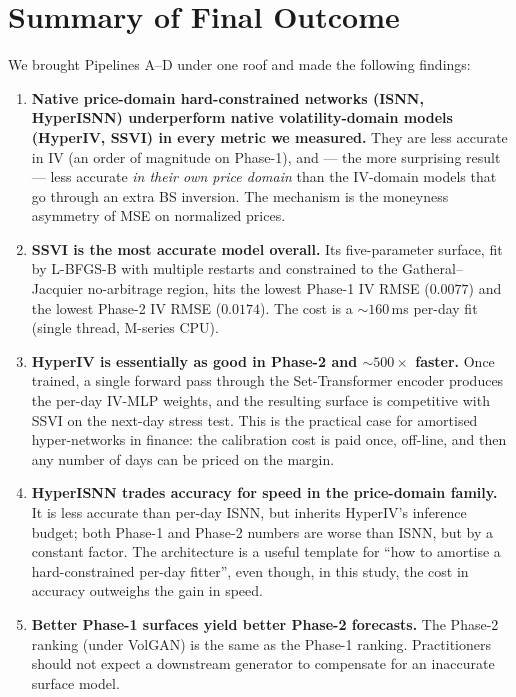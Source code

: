 \documentclass[11pt,a4paper]{article}
\begin{document}
\section{Summary of Final Outcome}
\label{sec:summary}

We brought Pipelines A--D under one roof and made the following findings:

\begin{enumerate}[leftmargin=*,itemsep=2pt]
  \item \textbf{Native price-domain hard-constrained networks (ISNN,
        HyperISNN) underperform native volatility-domain models
        (HyperIV, SSVI) in every metric we measured.} They are less
        accurate in IV (an order of magnitude on Phase-1), and --- the
        more surprising result --- less accurate \emph{in their own price
        domain} than the IV-domain models that go through an extra BS
        inversion. The mechanism is the moneyness asymmetry of MSE on
        normalized prices.
  \item \textbf{SSVI is the most accurate model overall.} Its
        five-parameter surface, fit by L-BFGS-B with multiple restarts and
        constrained to the Gatheral--Jacquier no-arbitrage region, hits
        the lowest Phase-1 IV RMSE ($0.0077$) and the lowest Phase-2 IV
        RMSE ($0.0174$). The cost is a $\sim$$160$\,ms per-day fit (single
        thread, M-series CPU).
  \item \textbf{HyperIV is essentially as good in Phase-2 and
        $\sim$$500\times$ faster.} Once trained, a single forward pass
        through the Set-Transformer encoder produces the per-day IV-MLP
        weights, and the resulting surface is competitive with SSVI on
        the next-day stress test. This is the practical case for
        amortised hyper-networks in finance: the calibration cost is paid
        once, off-line, and then any number of days can be priced on the
        margin.
  \item \textbf{HyperISNN trades accuracy for speed in the price-domain
        family.} It is less accurate than per-day ISNN, but inherits
        HyperIV's inference budget; both Phase-1 and Phase-2 numbers are
        worse than ISNN, but by a constant factor. The architecture is a
        useful template for ``how to amortise a hard-constrained
        per-day fitter'', even though, in this study, the cost in
        accuracy outweighs the gain in speed.
  \item \textbf{Better Phase-1 surfaces yield better Phase-2 forecasts.}
        The Phase-2 ranking (under VolGAN) is the same as the Phase-1
        ranking. Practitioners should not expect a downstream generator
        to compensate for an inaccurate surface model.
\end{enumerate}
\end{document}
